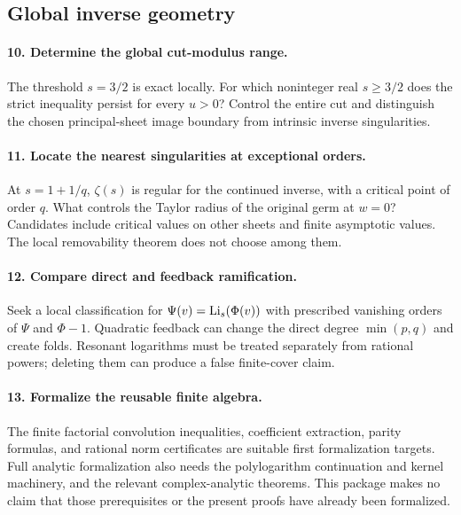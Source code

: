 \subsection{Global inverse geometry}

\paragraph{10. Determine the global cut-modulus range.}
The threshold $s=3/2$ is exact locally. For which noninteger
real $s\ge3/2$ does the strict inequality persist for every
$u>0$? Control the entire cut and distinguish the chosen
principal-sheet image boundary from intrinsic inverse singularities.

\paragraph{11. Locate the nearest singularities at exceptional orders.}
At $s=1+1/q$, $\zeta(s)$ is regular for the continued inverse,
with a critical point of order $q$. What controls the Taylor
radius of the original germ at $w=0$? Candidates include critical
values on other sheets and finite asymptotic values. The local
removability theorem does not choose among them.

\paragraph{12. Compare direct and feedback ramification.}
Seek a local classification for $\Psi(v)=\operatorname{Li}_s(\Phi(v))$
with prescribed vanishing orders of $\Psi$ and $\Phi-1$.
Quadratic feedback can change the direct degree $\min(p,q)$ and
create folds. Resonant logarithms must be treated separately from
rational powers; deleting them can produce a false finite-cover claim.

\paragraph{13. Formalize the reusable finite algebra.}
The finite factorial convolution inequalities, coefficient extraction,
parity formulas, and rational norm certificates are suitable first
formalization targets. Full analytic formalization also needs the
polylogarithm continuation and kernel machinery, and the relevant
complex-analytic theorems. This package makes no claim that those
prerequisites or the present proofs have already been formalized.
